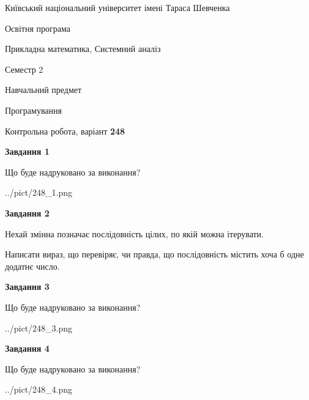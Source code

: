 \documentclass[12pt, ukrainian]{article}
\begin{document}
{{\begin {small}\par
{ \center  Київський національний університет імені Тараса Шевченка \par}
{\parbox {5 cm}{Освітня програма \hfill}{\parbox {8 cm}{Прикладна математика, Системний аналіз \hfill}}\parbox {5 cm}{\hfill Семестр 2}}\par
{\parbox {5 cm} {Навчальний предмет \hfill}\parbox {7 cm}{Програмування \hfill}\parbox {6cm}{\hfill}\par}\vspace{-7pt} \end{small}}{\center Контрольна робота, варіант  \No \textbf
{ 248 }\par}}
{
\begin {large}
{\begin {center}\textbf{Завдання 1}\end {center}}\par
Що буде надруковано за виконання?\par\par
\begin{center}
	{../pict/248_1.png}
\end{center}
\newpage

{\begin {center}\textbf{Завдання 2}\end {center}}\par
Нехай змінна  позначає послідовність цілих, по якій можна ітерувати.

Написати вираз, що перевіряє, чи правда, що послідовність  містить хоча б одне додатнє число.\par
\newpage

{\begin {center}\textbf{Завдання 3}\end {center}}\par
Що буде надруковано за виконання?\par
\begin{center}
	{../pict/248_3.png}
\end{center}
\newpage

{\begin {center}\textbf{Завдання 4}\end {center}}\par
Що буде надруковано за виконання?\par
\begin{center}
	{../pict/248_4.png}
\end{center}
\newpage


\end{large}}
\end{document}
